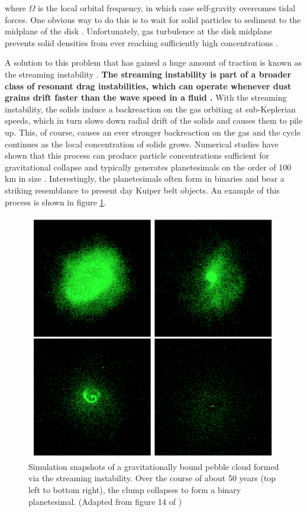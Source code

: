 \noindent where $\Omega$ is the local orbital frequency, in which case self-gravity overcomes tidal forces. One obvious way to do this is to wait for solid particles to sediment to the midplane of the disk \cite{goldreich73}. Unfortunately, gas turbulence at the disk midplane prevents solid densities from ever reaching sufficiently high concentrations \cite{cuzzi93}. 

 A solution to this problem that has gained a huge amount of traction is known as the streaming instability \cite{youdin05}. \textbf{The streaming instability is part of a broader class of resonant drag instabilities, which can operate whenever dust grains drift faster than the wave speed in a fluid \cite{squire18, squire20}.} With the streaming instability, the solids induce a backreaction on the gas orbiting at sub-Keplerian speeds, which in turn slows down radial drift of the solids and causes them to pile up. This, of course, causes an ever stronger backreaction on the gas and the cycle continues as the local concentration of solids grows. Numerical studies have shown that this process can produce particle concentrations sufficient for gravitational collapse and typically generates planetesimals on the order of 100 km in size \cite{johansen15, simon16, schafer17}. Interestingly, the planetesimals often form in binaries \cite{li19} and bear a striking resemblance to present day Kuiper belt objects. An example of this process is shown in figure \ref{fig:plCollapse}.
 
\begin{figure}
\begin{center}
    \includegraphics[width=\textwidth]{figures/intro/binaryPl.png}
    \caption{Simulation snapshots of a gravitationally bound pebble cloud formed via the streaming instability. Over the course of about 50 years (top left to bottom right), the clump collapses to form a binary planetesimal. (Adapted from figure 14 of \cite{nesvorny21})\label{fig:plCollapse}}
\end{center}
\end{figure}
 
